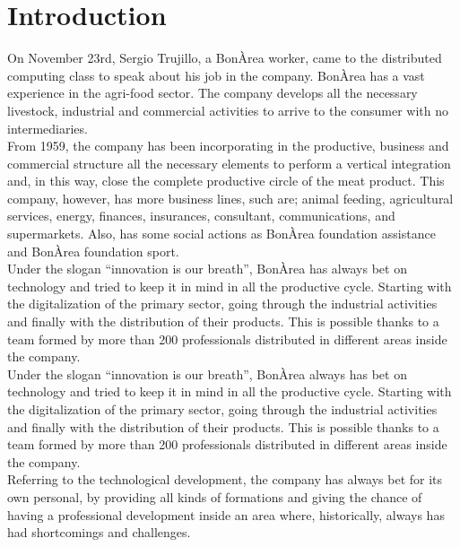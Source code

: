 \documentclass[12pt]{article}
\begin{document}
	\begin{titlepage}
		\maketitle
		\thispagestyle{empty}
	\end{titlepage}
	\cleardoublepage
	\newpage

\tableofcontents
\listoffigures
\thispagestyle{empty}

\newpage
\section*{Introduction}
On November 23rd, Sergio Trujillo, a BonÀrea worker, came to the distributed computing class to speak about his job in the company.
BonÀrea has a vast experience in the agri-food sector. The company develops all the necessary livestock, industrial and commercial activities to arrive to the consumer with no intermediaries.\\
From 1959, the company has been incorporating in the productive, business and commercial structure all the necessary elements to perform a vertical integration and, in this way, close the complete productive circle of the meat product.
This company, however, has more business lines, such are; animal feeding, agricultural services, energy, finances, insurances, consultant, communications, and supermarkets. Also, has some social actions as BonÀrea foundation assistance and BonÀrea foundation sport.\\
Under the slogan “innovation is our breath”, BonÀrea has always bet on technology and tried to keep it in mind in all the productive cycle. Starting with the digitalization of the primary sector, going through the industrial activities and finally with the distribution of their products. This is possible thanks to a team formed by more than 200 professionals distributed in different areas inside the company.\\
Under the slogan “innovation is our breath”, BonÀrea always has bet on technology and tried to keep it in mind in all the productive cycle. Starting with the digitalization of the primary sector, going through the industrial activities and finally with the distribution of their products. This is possible thanks to a team formed by more than 200 professionals distributed in different areas inside the company.\\
Referring to the technological development, the company has always bet for its own personal, by providing all kinds of formations and giving the chance of having a professional development inside an area where, historically, always has had shortcomings and challenges.\\
\end{document}
